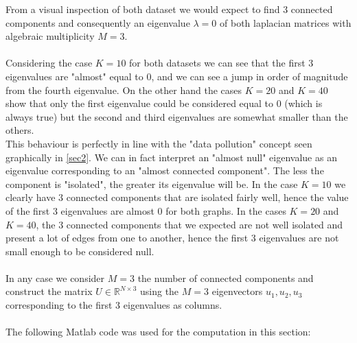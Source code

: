 From a visual inspection of both dataset we would expect to find 3 connected components and consequently an eigenvalue \(\lambda= 0\) of both laplacian matrices with algebraic multiplicity \(M= 3\).
\\
\\
Considering the case \(K= 10\) for both datasets we can see that the first 3 eigenvalues are "almost" equal to 0, and we can see a jump in order of magnitude from the fourth eigenvalue.
On the other hand the cases \(K=20\) and \(K=40\) show that only the first eigenvalue could be considered equal to 0 (which is always true) but the second and third eigenvalues are somewhat smaller than the others.
\\
This behaviour is perfectly in line with the "data pollution" concept seen graphically in \ref{sec2}. We can in fact interpret an "almost null" eigenvalue as an eigenvalue corresponding to an "almost connected component". The less the component is "isolated", the greater its eigenvalue will be. In the case \(K=10\) we clearly have 3 connected components that are isolated fairly well, hence the value of the first 3 eigenvalues are almost 0 for both graphs. In the cases \(K=20\) and \(K=40\), the 3 connected components that we expected are not well isolated and present a lot of edges from one to another, hence the first 3 eigenvalues are not small enough to be considered null.\\
\\
In any case we consider \(M=3\) the number of connected components and construct the matrix \(U\in \mathbb{R}^{N\times 3}\) using the \(M=3\) eigenvectors \(u_1, u_2, u_3\) corresponding to the first 3 eigenvalues as columns.
\\
\\
The following Matlab code was used for the computation in this section:
